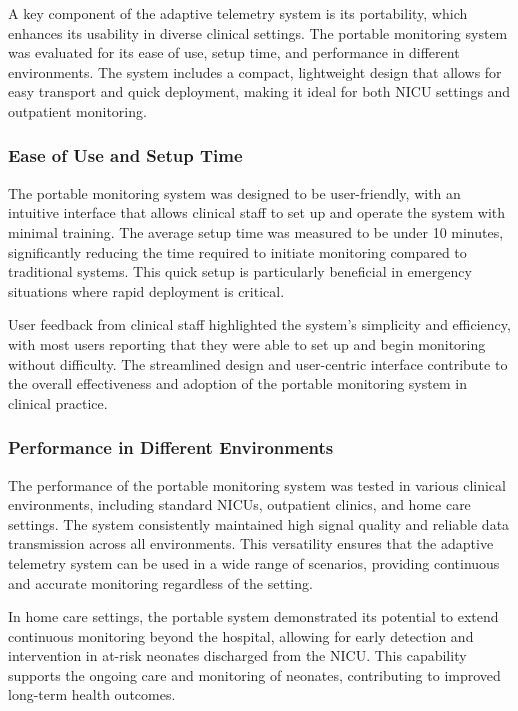 \documentclass[12pt,journal,compsoc]{IEEEtran}
\begin{document}
A key component of the adaptive telemetry system is its portability, which enhances its usability in diverse clinical settings. The portable monitoring system was evaluated for its ease of use, setup time, and performance in different environments. The system includes a compact, lightweight design that allows for easy transport and quick deployment, making it ideal for both NICU settings and outpatient monitoring.

\subsubsection{Ease of Use and Setup Time}

The portable monitoring system was designed to be user-friendly, with an intuitive interface that allows clinical staff to set up and operate the system with minimal training. The average setup time was measured to be under 10 minutes, significantly reducing the time required to initiate monitoring compared to traditional systems. This quick setup is particularly beneficial in emergency situations where rapid deployment is critical.

User feedback from clinical staff highlighted the system's simplicity and efficiency, with most users reporting that they were able to set up and begin monitoring without difficulty. The streamlined design and user-centric interface contribute to the overall effectiveness and adoption of the portable monitoring system in clinical practice.

\subsubsection{Performance in Different Environments}

The performance of the portable monitoring system was tested in various clinical environments, including standard NICUs, outpatient clinics, and home care settings. The system consistently maintained high signal quality and reliable data transmission across all environments. This versatility ensures that the adaptive telemetry system can be used in a wide range of scenarios, providing continuous and accurate monitoring regardless of the setting.

In home care settings, the portable system demonstrated its potential to extend continuous monitoring beyond the hospital, allowing for early detection and intervention in at-risk neonates discharged from the NICU. This capability supports the ongoing care and monitoring of neonates, contributing to improved long-term health outcomes.
\end{document}
